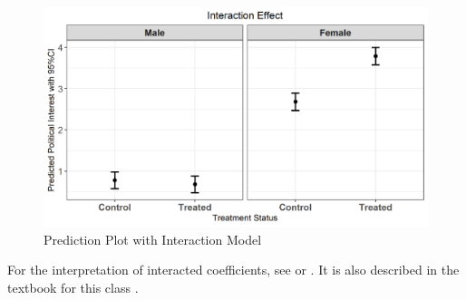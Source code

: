 \documentclass[letterpaper, 12pt]{article}
\begin{document}
    \begin{figure}[h!] %
        \centering
          \includegraphics[width=6in]{pri.png}
          \caption{Prediction Plot with Interaction Model} %
          \label{pri} %
    \end{figure}

    \par For the interpretation of interacted coefficients, see \cite{Friedrich1982inde} or \cite{Brambor2006unin}. It is also described in the textbook for this class \citep{Fox2016apre}.

    
    
\end{document}
